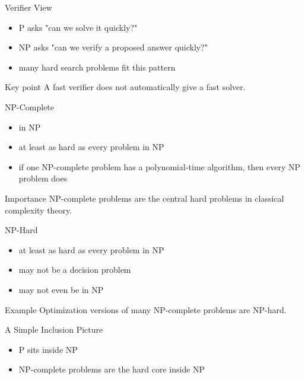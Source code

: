 \documentclass[aspectratio=169,xcolor=dvipsnames]{beamer}
\begin{document}
\begin{frame}{Verifier View}
  \begin{itemize}
    \item P asks "can we solve it quickly?"
    \item NP asks "can we verify a proposed answer quickly?"
    \item many hard search problems fit this pattern
  \end{itemize}
  \begin{exampleblock}{Key point}
    A fast verifier does not automatically give a fast solver.
  \end{exampleblock}
\end{frame}

\begin{frame}{NP-Complete}
  \begin{itemize}
    \item in NP
    \item at least as hard as every problem in NP
    \item if one NP-complete problem has a polynomial-time algorithm, then every NP problem does
  \end{itemize}
  \begin{alertblock}{Importance}
    NP-complete problems are the central hard problems in classical complexity theory.
  \end{alertblock}
\end{frame}

\begin{frame}{NP-Hard}
  \begin{itemize}
    \item at least as hard as every problem in NP
    \item may not be a decision problem
    \item may not even be in NP
  \end{itemize}
  \begin{block}{Example}
    Optimization versions of many NP-complete problems are NP-hard.
  \end{block}
\end{frame}

\begin{frame}{A Simple Inclusion Picture}
  \begin{center}
  \end{center}
  \begin{itemize}
    \item P sits inside NP
    \item NP-complete problems are the hard core inside NP
  \end{itemize}
\end{frame}
\end{document}
